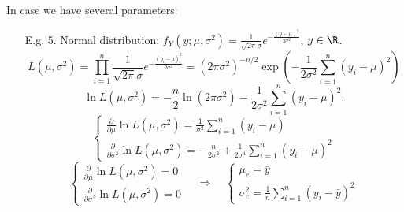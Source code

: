 \begin{frame}


In case we have several parameters:
\vfill

 \begin{enumerate}
 \item[E.g. 5.] Normal distribution: $f_Y(y;\mu,\sigma^2)= \frac{1}{\sqrt{2\pi} \sigma} e^{-\frac{(y-\mu)^2}{2\sigma^2}}$, $y\in\R$.
 \[
 L(\mu,\sigma^2) = \prod_{i=1}^n \frac{1}{\sqrt{2\pi} \sigma} e^{-\frac{(y_i-\mu)^2}{2\sigma^2}}
 = (2\pi\sigma^2)^{-n/2} \exp\left(-\frac{1}{2\sigma^2}\sum_{i=1}^n(y_i-\mu)^2 \right)
 \]\pause
 \[
 \ln L(\mu,\sigma^2) = -\frac{n}{2}\ln(2\pi\sigma^2) -\frac{1}{2\sigma^2}\sum_{i=1}^n (y_i-\mu)^2.
 \]\pause
 \[
 \begin{cases}
  \displaystyle \frac{\partial }{\partial \mu} \ln L(\mu,\sigma^2) = \frac{1}{\sigma^2}\sum_{i=1}^n
(y_i-\mu) \\
\displaystyle  \frac{\partial }{\partial \sigma^2} \ln L(\mu,\sigma^2) = -\frac{n}{2\sigma^2}+\frac{1}{2\sigma^4}\sum_{i=1}^n(y_i-\mu)^2
\end{cases}
 \]\pause
 \[
 \begin{cases}
  \displaystyle \frac{\partial }{\partial \mu} \ln L(\mu,\sigma^2) = 0\\
\displaystyle  \frac{\partial }{\partial \sigma^2} \ln L(\mu,\sigma^2) =0
\end{cases}
\quad\Longrightarrow\quad
\boxed{\begin{cases}
 \displaystyle \mu_e=\bar{y}\\
 \displaystyle  \sigma_e^2=\frac{1}{n}\sum_{i=1}^n(y_i-\bar{y})^2
\end{cases}}
 \]
\end{enumerate}

\end{frame}
